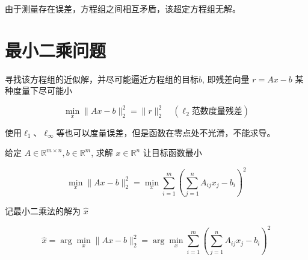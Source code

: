 由于测量存在误差，方程组之间相互矛盾，该超定方程组无解。

\section{最小二乘问题}

\begin{problem}[最小二乘问题]
    寻找该方程组的近似解，并尽可能逼近方程组的目标$b$, 即残差向量 $ r=A x-b $ 某种度量下尽可能小

    \begin{equation} \min _{x}\|A x-b\|_{2}^{2}=\|r\|_{2}^{2} \quad (\ell_2范数度量残差) \end{equation}
\end{problem}


使用$\ell_1$、$\ell_\infty$等也可以度量误差，但是函数在零点处不光滑，不能求导。

\begin{problem}[求解最小二乘解]
    给定 $ {A} \in \mathbb{R}^{m \times n}, {b} \in \mathbb{R}^{m} $, 求解 $ x \in \mathbb{R}^{n} $ 让目标函数最小

\begin{equation} \min _{x}\|A x-b\|_{2}^{2}=\min _{x} \sum_{i=1}^{m}\left(\sum_{j=1}^{n} A_{i j} x_{j}-b_{i}\right)^{2} \end{equation}
\end{problem}

\begin{notation}[最小二乘法的解]
    记最小二乘法的解为 $ \hat{x} $

    \begin{equation}
    \hat{x}=\arg \underset{x}{\min}\|A x-b\|_{2}^{2}=\arg \underset{x}{\min} \sum_{i=1}^{m}\left(\sum_{j=1}^{n} A_{i j} x_{j}-b_{i}\right)^{2}
    \end{equation}
\end{notation}

